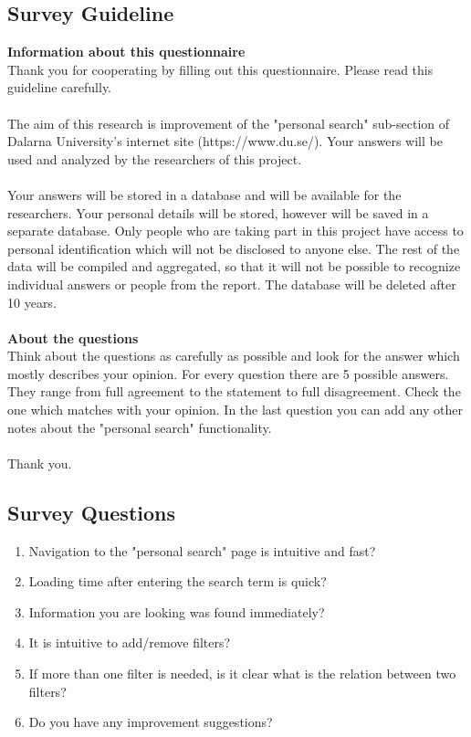 \documentclass[12pt,a4paper,paper=a4,oneside,titlepage,pdftex]{scrartcl}
\begin{document}
\subsection{Survey Guideline}
\textbf{Information about this questionnaire}\\
Thank you for cooperating by filling out this questionnaire. Please read this guideline carefully.
\\ \\
The aim of this research is improvement of the "personal search" sub-section of Dalarna University's internet site (https://www.du.se/). Your answers will be used and analyzed by the researchers of this project.
\\ \\
Your answers will be stored in a database and will be available for the researchers. Your personal details will be stored, however will be saved in a separate database. Only people who are taking part in this project have access to personal identification which will not be disclosed to anyone else. The rest of the data will be compiled and aggregated, so that it will not be possible to recognize individual answers or people from the report. The database will be deleted after 10 years.
\\ \\
\textbf{About the questions}\\
Think about the questions as carefully as possible and look for the answer which mostly describes your opinion. For every question there are 5 possible answers. They range from full agreement to the statement to full disagreement. Check the one which matches with your opinion. In the last question you can add any other notes about the "personal search" functionality.
\\ \\
Thank you.

\subsection{Survey Questions}
\begin{enumerate}
	\item Navigation to the "personal search" page is intuitive and fast?
	\item Loading time after entering the search term is quick? 
	\item Information you are looking was found immediately?
	\item It is intuitive to add/remove filters?
	\item If more than one filter is needed, is it clear what is the relation between two filters?
	\item Do you have any improvement suggestions?
\end{enumerate}
\end{document}
